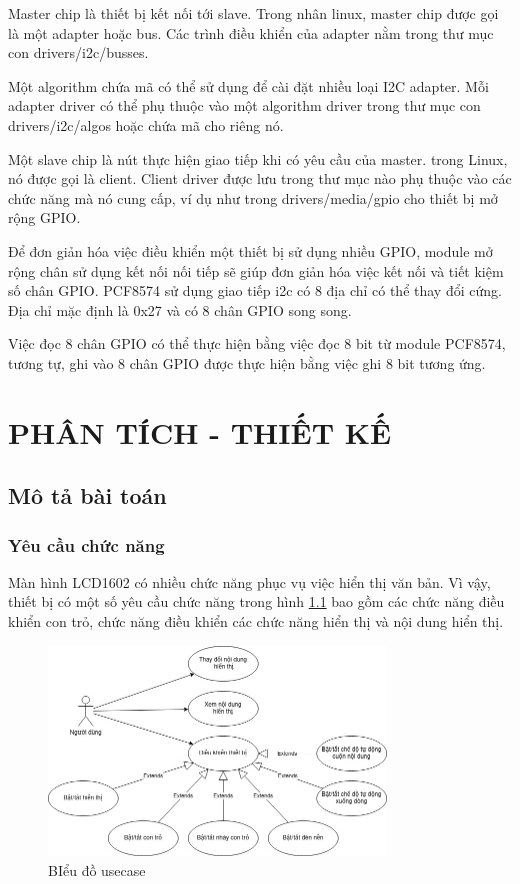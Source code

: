 \documentclass{report}
\begin{document}
Master chip là thiết bị kết nối tới slave. Trong nhân linux, master chip được gọi là một adapter hoặc bus. Các trình điều khiển của adapter nằm trong thư mục con drivers/i2c/busses.

Một algorithm chứa mã có thể sử dụng để cài đặt nhiều loại I2C adapter. Mỗi adapter driver có thể phụ thuộc vào một algorithm driver trong thư mục con drivers/i2c/algos hoặc chứa mã cho riêng nó.

Một slave chip là nút thực hiện giao tiếp khi có yêu cầu của master. trong Linux, nó được gọi là client. Client driver được lưu trong thư mục nào phụ thuộc vào các chức năng mà nó cung cấp, ví dụ như trong drivers/media/gpio cho thiết bị mở rộng GPIO.


Để đơn giản hóa việc điều khiển một thiết bị sử dụng nhiều GPIO, module mở rộng chân sử dụng kết nối nối tiếp sẽ giúp đơn giản hóa việc kết nối và tiết kiệm số chân GPIO. PCF8574 sử dụng giao tiếp \acrshort{i2c} có 8 địa chỉ có thể thay đổi cứng. Địa chỉ mặc định là 0x27 và có 8 chân GPIO song song. 

Việc đọc 8 chân GPIO có thể thực hiện bằng việc đọc 8 bit từ module PCF8574, tương tự, ghi vào 8 chân GPIO được thực hiện bằng việc ghi 8 bit tương ứng.


\chapter{PHÂN TÍCH - THIẾT KẾ}
\section{Mô tả bài toán}
\subsection{Yêu cầu chức năng}
Màn hình LCD1602 có nhiều chức năng phục vụ việc hiển thị văn bản. Vì vậy, thiết bị có một số yêu cầu chức năng trong hình \ref{func-req} bao gồm các chức năng điều khiển con trỏ, chức năng điều khiển các chức năng hiển thị và nội dung hiển thị.
\begin{figure}[H]
	\centering
	\includegraphics[width=0.8\textwidth]{../images/linux-usecase.jpg}
	\caption{BIểu đồ usecase}
	\label{func-req}
\end{figure}
\end{document}
